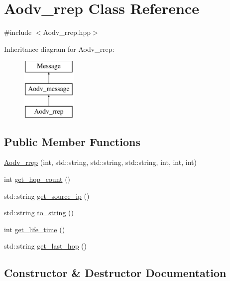 \hypertarget{class_aodv__rrep}{}\section{Aodv\+\_\+rrep Class Reference}
\label{class_aodv__rrep}


{\ttfamily \#include $<$Aodv\+\_\+rrep.\+hpp$>$}

Inheritance diagram for Aodv\+\_\+rrep\+:\begin{figure}[H]
\begin{center}
\leavevmode
\includegraphics[height=3.000000cm]{class_aodv__rrep}
\end{center}
\end{figure}
\subsection*{Public Member Functions}
\begin{DoxyCompactItemize}
\item 
\hyperlink{class_aodv__rrep_a414ec4ee8755f79763dddb9aa099ceda}{Aodv\+\_\+rrep} (int, std\+::string, std\+::string, std\+::string, int, int, int)
\item 
int \hyperlink{class_aodv__rrep_a5e9e495a15cdff5c8996f6d809778074}{get\+\_\+hop\+\_\+count} ()
\item 
std\+::string \hyperlink{class_aodv__rrep_a5acc147ba171378fe0e27bdd4210925d}{get\+\_\+source\+\_\+ip} ()
\item 
std\+::string \hyperlink{class_aodv__rrep_a4cd8e202122b563276c4395ff2bcd32d}{to\+\_\+string} ()
\item 
int \hyperlink{class_aodv__rrep_a9c8244ec089fb98cd0db200ae04343bd}{get\+\_\+life\+\_\+time} ()
\item 
std\+::string \hyperlink{class_aodv__rrep_acbce91f19fcf4379a0c67a12025ea345}{get\+\_\+last\+\_\+hop} ()
\end{DoxyCompactItemize}


\subsection{Constructor \& Destructor Documentation}
